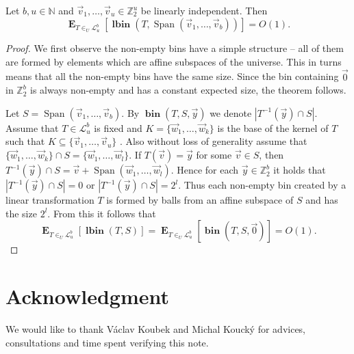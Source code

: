 \documentclass[unicode,review]{siamart1116}
\newcommand{\bin}[3]{\operatorname{\mathbf{bin}}({#1}, {#2}, {#3})}
\newcommand{\lbin}[2]{\operatorname{\mathbf{lbin}}({#1}, {#2})}
\newcommand{\vecspace}[2]{\mathbb{Z}_{#1}^{#2}}
\newcommand{\binvecspace}[1]{\vecspace{2}{#1}}
\newcommand{\linearmaps}[2]{\mathcal{L}_{#1}^{#2}}
\newcommand{\expects}[2]{\operatorname{\mathbf{E}}_{{#1}}\left[{#2}\right]}
\numberwithin{theorem}{section}
\begin{document}
\begin{theorem}
Let $b, u \in \mathbb{N}$ and $\vec{v}_1, \dots, \vec{v}_u \in \mathbb{Z}_2^u$ be linearly independent. Then \[ \expects{T \in_U \linearmaps{u}{b}}{\lbin{T}{\operatorname{Span}(\vec{v}_1, \dots, \vec{v}_b)}} = O(1).\]
\end{theorem}
\begin{proof}
We first observe the non-empty bins have a simple structure -- all of them are formed by elements which are affine subspaces of the universe.
This in turns means that all the non-empty bins have the same size.
Since the bin containing $\vec{0}$ in $\binvecspace{b}$ is always non-empty and has a constant expected size, the theorem follows.

Let $S = \operatorname{Span}(\vec{v}_1, \dots, \vec{v}_b)$.
By $\bin{T}{S}{\vec{y}}$ we denote $|T^{-1}(\vec{y}) \cap S|$.
Assume that $T \in \linearmaps{u}{b}$ is fixed and $K = \{\vec{w}_1, \dots, \vec{w}_k\}$ is the base of the kernel of $T$ such that $K \subseteq \{\vec{v}_1, \dots, \vec{v}_u\}$ .
Also without loss of generality assume that $\{\vec{w}_1, \dots, \vec{w}_k\} \cap S = \{\vec{w}_1, \dots, \vec{w}_l\}$.
If $T(\vec{v}) = \vec{y}$ for some $\vec{v} \in S$, then $T^{-1}(\vec y) \cap S = \vec v + \operatorname{Span}(\vec w_1, \dots, \vec w_l)$.
Hence for each $\vec y \in \mathbb{Z}_2^b$ it holds that $|T^{-1}(\vec y) \cap S| = 0$ or $|T^{-1}(\vec y) \cap S| = 2^l$.
Thus each non-empty bin created by a linear transformation $T$ is formed by balls from an affine subspace of $S$ and has the size $2^l$.
From this it follows that 
\[
\expects{T\in_U \linearmaps{u}{b}}{\lbin{T}{S}} = \expects{T\in_U \linearmaps{u}{b}}{\bin{T}{S}{\vec 0}} = O(1).
\]

\end{proof}

\section{Acknowledgment}

We would like to thank V\'aclav Koubek and Michal Kouck\'y for advices, consultations and time spent verifying this note.



\end{document}
